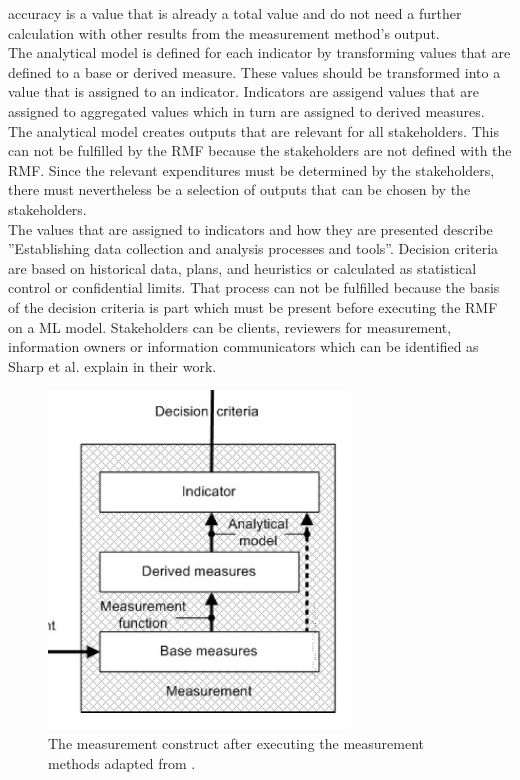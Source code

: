 accuracy is a value that is already a total value \cite{9783960101925} and do not need a further calculation with other results from the measurement method's output. \\ The analytical model is defined for each indicator by transforming values that are defined to a base or derived measure. These values should be transformed into a value that is assigned to an indicator. Indicators are assigend values that are assigned to aggregated values which in turn are assigned to derived measures. The analytical model creates outputs that are relevant for all stakeholders. This can not be fulfilled by the RMF because the stakeholders are not defined with the RMF. Since the relevant expenditures must be determined by the stakeholders, there must nevertheless be a selection of outputs that can be chosen by the stakeholders. \\ The values that are assigned to indicators and how they are presented describe ''Establishing data collection and analysis processes and tools''. Decision criteria are based on historical data, plans, and heuristics or calculated as statistical control or confidential limits. That process can not be fulfilled because the basis of the decision criteria is part which must be present before executing the RMF on a ML model. Stakeholders can be clients, reviewers for measurement, information owners or information communicators \cite{ISO_27004_2009} which can be identified as
Sharp et al. \cite{DBLP:conf/dexaw/SharpFG99} explain in their work.

\begin{figure}[ht!]
  \centering
  \includegraphics[width=8cm]{pictures/measurement.jpg}
  \caption{The measurement construct after executing the measurement methods adapted from \cite{ISO_27004_2009}.}
  \label{fig:measurement}
\end{figure}

